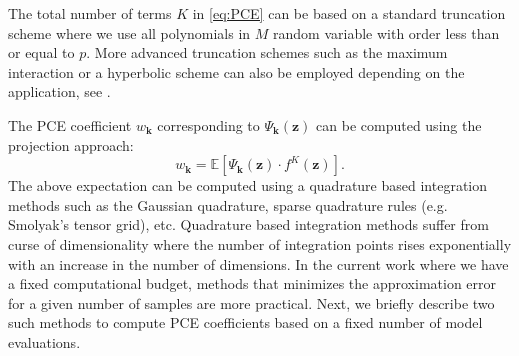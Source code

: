 \documentclass[review]{elsarticle}
\numberwithin{equation}{section}
\numberwithin{equation}{section}
\begin{document}
The total number of terms $K$ in \eqref{eq:PCE} can be based on a standard truncation scheme where we use all polynomials in $M$ random variable with order less than or equal to $p$. More advanced truncation schemes such as the maximum interaction or a hyperbolic scheme can also be employed depending on the application, see \cite{BlatmanThesis}. 

The PCE coefficient $w_{\mathbf{k}}$ corresponding to $\Psi_{\mathbf{k}}(\mathbf{z})$ can be computed using the projection approach:
\begin{equation}\label{eq:projection}
w_{\mathbf{k}} = \mathbb{E}[\Psi_{\mathbf{k}}(\mathbf{z})\cdot f^{K}(\mathbf{z})].
\end{equation} 
The above expectation can be computed using a quadrature based integration methods such as the Gaussian quadrature, sparse quadrature rules (e.g. Smolyak's tensor grid), etc. Quadrature based integration methods suffer from curse of dimensionality where the number of integration points rises exponentially with an increase in the number of dimensions. In the current work where we have a fixed computational budget, methods that minimizes the approximation error for a given number of samples are more practical. Next, we briefly describe two such methods to compute PCE coefficients based on a fixed number of model evaluations.
\end{document}
